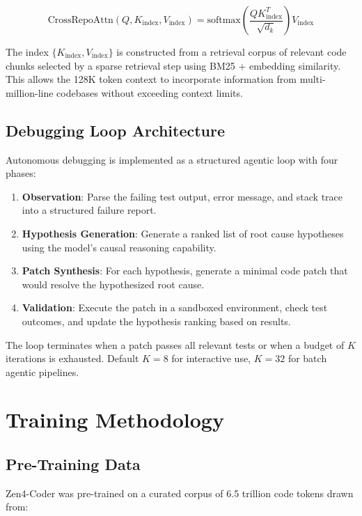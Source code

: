 \documentclass[11pt,a4paper]{article}
\begin{document}
\begin{equation}
  \text{CrossRepoAttn}(Q, K_{\text{index}}, V_{\text{index}}) = \text{softmax}\left(\frac{Q K_{\text{index}}^T}{\sqrt{d_k}}\right) V_{\text{index}}
\end{equation}

The index $\{K_{\text{index}}, V_{\text{index}}\}$ is constructed from a retrieval corpus of relevant code chunks selected by a sparse retrieval step using BM25 + embedding similarity. This allows the 128K token context to incorporate information from multi-million-line codebases without exceeding context limits.

\subsection{Debugging Loop Architecture}

Autonomous debugging is implemented as a structured agentic loop with four phases:

\begin{enumerate}
  \item \textbf{Observation}: Parse the failing test output, error message, and stack trace into a structured failure report.
  \item \textbf{Hypothesis Generation}: Generate a ranked list of root cause hypotheses using the model's causal reasoning capability.
  \item \textbf{Patch Synthesis}: For each hypothesis, generate a minimal code patch that would resolve the hypothesized root cause.
  \item \textbf{Validation}: Execute the patch in a sandboxed environment, check test outcomes, and update the hypothesis ranking based on results.
\end{enumerate}

The loop terminates when a patch passes all relevant tests or when a budget of $K$ iterations is exhausted. Default $K = 8$ for interactive use, $K = 32$ for batch agentic pipelines.

\section{Training Methodology}

\subsection{Pre-Training Data}

Zen4-Coder was pre-trained on a curated corpus of 6.5 trillion code tokens drawn from:
\end{document}
